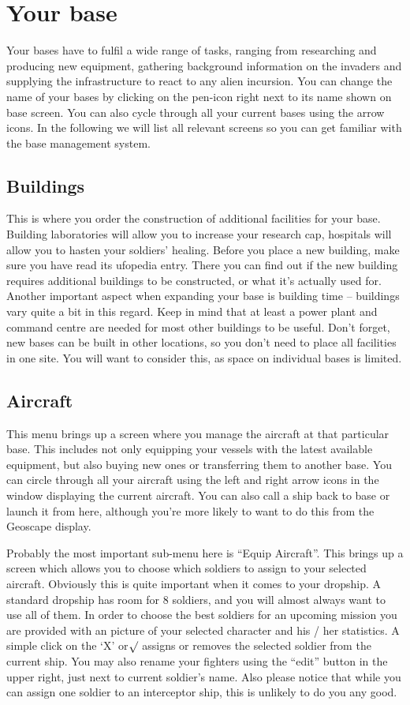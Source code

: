 \section{Your base}
Your bases have to fulfil a wide range of tasks, ranging from researching and producing new equipment, gathering background information on the invaders and supplying the infrastructure to react to any alien incursion. You can change the name of your bases by clicking on the pen-icon right next to its name shown on base screen. You can also cycle through all your current bases using the arrow icons. In the following we will list all relevant screens so you can get familiar with the base management system.

\subsection{Buildings}
This is where you order the construction of additional facilities for your base.  Building laboratories will allow you to increase your research cap, hospitals will allow you to hasten your soldiers' healing.
Before you place a new building, make sure you have read its ufopedia entry. There you can find out if the new building requires additional buildings to be constructed, or what it's actually used for. Another important aspect when expanding your base is building time -- buildings vary quite a bit in this regard. Keep in mind that at least a power plant and command centre are needed for most other buildings to be useful. Don't forget, new bases can be built in other locations, so you don't need to place all facilities in one site. You will want to consider this, as space on individual bases is limited.

\subsection{Aircraft}
This menu brings up a screen where you manage the aircraft at that particular base. This includes not only equipping your vessels with the latest available equipment, but also buying new ones or transferring them to another base. You can circle through all your aircraft using the left and right arrow icons in the window displaying the current aircraft. You can also call a ship back to base or launch it from here, although you're more likely to want to do this from the Geoscape display.

Probably the most important sub-menu here is ``Equip Aircraft''.  This brings up a screen which allows you to choose which soldiers to assign to your selected aircraft. Obviously this is quite important when it comes to your dropship. A standard dropship has room for 8 soldiers, and you will almost always want to use all of them. In order to choose the best soldiers for an upcoming mission you are provided with an picture of your selected character and his / her statistics. A simple click on the `X' or$\surd$ assigns or removes the selected soldier from the current ship. You may also rename your fighters using the ``edit'' button in the upper right, just next to current soldier's name. Also please notice that while you can assign one soldier to an interceptor ship, this is unlikely to do you any good.

